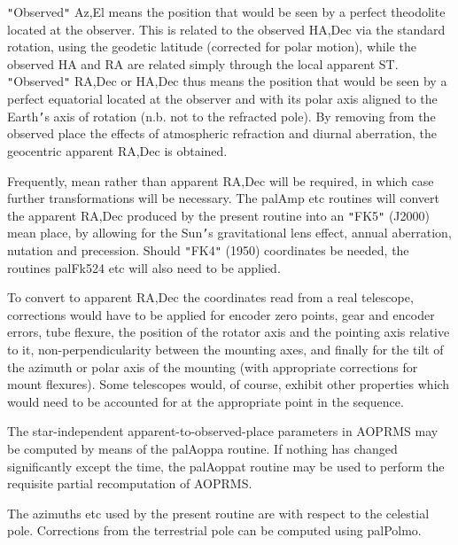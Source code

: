 \documentclass[twoside,11pt]{article}
\renewcommand{\_}{\texttt{\symbol{95}}}
\newcommand{\sstitem}{\item}
\newcommand{\sstitem}{\item}
\begin{document}
{{{         \sstitem
         {\tt "}Observed{\tt "} Az,El means the position that would be seen by a
         perfect theodolite located at the observer.  This is
         related to the observed HA,Dec via the standard rotation, using
         the geodetic latitude (corrected for polar motion), while the
         observed HA and RA are related simply through the local
         apparent ST.  {\tt "}Observed{\tt "} RA,Dec or HA,Dec thus means the
         position that would be seen by a perfect equatorial located
         at the observer and with its polar axis aligned to the
         Earth{\tt '}s axis of rotation (n.b. not to the refracted pole).
         By removing from the observed place the effects of
         atmospheric refraction and diurnal aberration, the
         geocentric apparent RA,Dec is obtained.

         \sstitem
         Frequently, mean rather than apparent RA,Dec will be required,
         in which case further transformations will be necessary.  The
         palAmp etc routines will convert the apparent RA,Dec produced
         by the present routine into an {\tt "}FK5{\tt "} (J2000) mean place, by
         allowing for the Sun{\tt '}s gravitational lens effect, annual
         aberration, nutation and precession.  Should {\tt "}FK4{\tt "} (1950)
         coordinates be needed, the routines palFk524 etc will also
         need to be applied.

         \sstitem
         To convert to apparent RA,Dec the coordinates read from a
         real telescope, corrections would have to be applied for
         encoder zero points, gear and encoder errors, tube flexure,
         the position of the rotator axis and the pointing axis
         relative to it, non-perpendicularity between the mounting
         axes, and finally for the tilt of the azimuth or polar axis
         of the mounting (with appropriate corrections for mount
         flexures).  Some telescopes would, of course, exhibit other
         properties which would need to be accounted for at the
         appropriate point in the sequence.

         \sstitem
         The star-independent apparent-to-observed-place parameters
         in AOPRMS may be computed by means of the palAoppa routine.
         If nothing has changed significantly except the time, the
         palAoppat routine may be used to perform the requisite
         partial recomputation of AOPRMS.

         \sstitem
         The azimuths etc used by the present routine are with respect
         to the celestial pole.  Corrections from the terrestrial pole
         can be computed using palPolmo.
      }
   }
}
\end{document}
